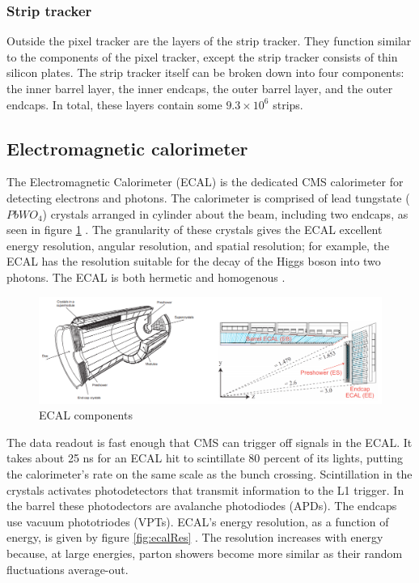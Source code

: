\subsubsection{Strip tracker}

Outside the pixel tracker are the layers of the strip tracker. They function similar to the components of the pixel tracker, except the strip tracker consists of thin silicon plates. The strip tracker itself can be broken down into four components: the inner barrel layer, the inner endcaps, the outer barrel layer, and the outer endcaps. In total, these layers contain some $9.3 \times 10^6$ strips. 

\subsection{Electromagnetic calorimeter}

The Electromagnetic Calorimeter (ECAL) is the dedicated CMS calorimeter for detecting electrons and photons. The calorimeter is comprised of lead tungstate ($PbWO_4$) crystals arranged in cylinder about the beam, including two endcaps, as seen in figure \ref{fig:ecalComp} \cite{Benaglia:2014aqa}. The granularity of these crystals gives the ECAL excellent energy resolution, angular resolution, and spatial resolution; for example, the ECAL has the resolution suitable for the decay of the Higgs boson into two photons. The ECAL is both hermetic and homogenous \cite{elect_cms_note06}. 

\begin{figure}[]
\begin{centering}
\includegraphics[width=7in]{Chapter3/importfigs/ecal_performance_with_examples.png}
\par\end{centering}
\caption{ECAL components \cite{Benaglia:2014aqa} \label{fig:ecalComp}}
\end{figure}

The data readout is fast enough that CMS can trigger off signals in the ECAL. It takes about 25 ns for an ECAL hit to scintillate 80 percent of its lights, putting the calorimeter's rate on the same scale as the bunch crossing. Scintillation in the crystals activates photodetectors that transmit information to the L1 trigger. In the barrel these photodectors are avalanche photodiodes (APDs). The endcaps use vacuum phototriodes (VPTs). ECAL's energy resolution, as a function of energy, is given by figure \ref{fig:ecalRes} \cite{Bayatian:2006nff}. The resolution increases with energy because, at large energies, parton showers become more similar as their random fluctuations average-out.


